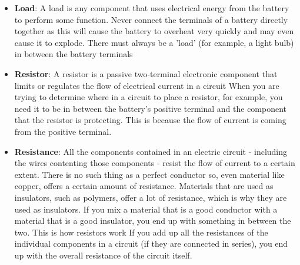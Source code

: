 \documentclass{report}
\begin{document}
\begin{itemize}
            \begin{enumerate}
                \item At the negative terminal, a chemical reaction releases electrons.
                \item When a circuit is connected, the battery establishes an electric field through the wire.
                \item Because electrons are negatively charged, they move opposite the electric field, from the negative terminal, through the device, to the positive terminal.
                \item At the positive terminal, another chemical reaction accepts those electrons
            \end{enumerate}
        \item \textbf{Load}: A load is any component that uses electrical energy from the battery to perform some function.
            \bigbreak \noindent 
            Never connect the terminals of a battery directly together as this will cause the battery to overheat very quickly and may even cause it to explode. There must always be a 'load' (for example, a light bulb) in between the battery terminals
        \item \textbf{Resistor}: A resistor is a passive two-terminal electronic component that limits or regulates the flow of electrical current in a circuit
            \bigbreak \noindent 
            When you are trying to determine where in a circuit to place a resistor, for example, you need it to be in between the battery's positive terminal and the component that the resistor is protecting. This is because the flow of current is coming from the positive terminal.
        \item \textbf{Resistance}: All the components contained in an electric circuit - including the wires contenting those components - resist the flow of current to a certain extent. There is no such thing as a perfect conductor so, even material like copper, offers a certain amount of resistance. Materials that are used as insulators, such as polymers, offer a lot of resistance, which is why they are used as insulators. If you mix a material that is a good conductor with a material that is a good insulator, you end up with something in between the two. This is how resistors work
            \bigbreak \noindent 
            If you add up all the resistances of the individual components in a circuit (if they are connected in series), you end up with the overall resistance of the circuit itself.
            \bigbreak \noindent 

\end{itemize}
\end{document}
